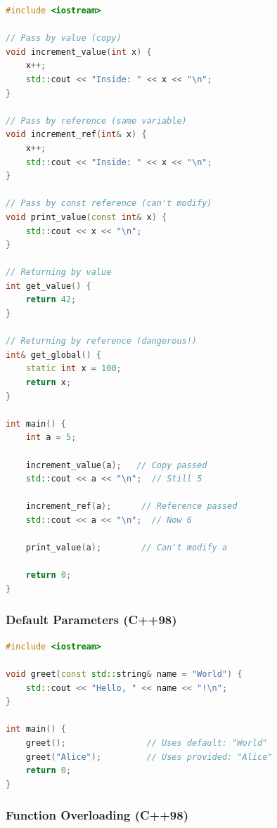 \begin{lstlisting}[language={C++}]
#include <iostream>

// Pass by value (copy)
void increment_value(int x) {
    x++;
    std::cout << "Inside: " << x << "\n";
}

// Pass by reference (same variable)
void increment_ref(int& x) {
    x++;
    std::cout << "Inside: " << x << "\n";
}

// Pass by const reference (can't modify)
void print_value(const int& x) {
    std::cout << x << "\n";
}

// Returning by value
int get_value() {
    return 42;
}

// Returning by reference (dangerous!)
int& get_global() {
    static int x = 100;
    return x;
}

int main() {
    int a = 5;

    increment_value(a);   // Copy passed
    std::cout << a << "\n";  // Still 5

    increment_ref(a);      // Reference passed
    std::cout << a << "\n";  // Now 6

    print_value(a);        // Can't modify a

    return 0;
}
\end{lstlisting}

\hypertarget{default-parameters-c98}{%
\subsubsection{Default Parameters
(C++98)}\label{default-parameters-c98}}

\begin{lstlisting}[language={C++}]
#include <iostream>

void greet(const std::string& name = "World") {
    std::cout << "Hello, " << name << "!\n";
}

int main() {
    greet();                // Uses default: "World"
    greet("Alice");         // Uses provided: "Alice"
    return 0;
}
\end{lstlisting}

\hypertarget{function-overloading-c98}{%
\subsubsection{Function Overloading
(C++98)}\label{function-overloading-c98}}

